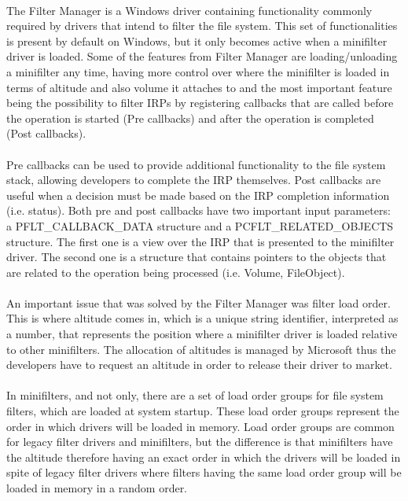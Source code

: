 		\paragraph{}
		The Filter Manager is a Windows driver containing functionality commonly required by drivers that intend to filter the file system. This set of functionalities is present by default on Windows, but it only becomes active when a minifilter driver is loaded\cite{MSDNFltMgrConcepts}. Some of the features from Filter Manager are loading/unloading a minifilter any time, having more control over where the minifilter is loaded in terms of altitude and also volume it attaches to and the most important feature being the possibility to filter IRPs by registering callbacks that are called before the operation is started (Pre callbacks) and after the operation is completed (Post callbacks). 
		
		\paragraph{}	
		Pre callbacks can be used to provide additional functionality to the file system stack, allowing developers to complete the IRP themselves. Post callbacks are useful when a decision must be made based on the IRP completion information (i.e. status). Both pre and post callbacks have two important input parameters: \\ a PFLT\_CALLBACK\_DATA structure and a PCFLT\_RELATED\_OBJECTS structure. The first one is a view over the IRP that is presented to the minifilter driver. The second one is a structure that contains pointers to the objects that are related to the operation being processed (i.e. Volume, FileObject).
		
		\paragraph{}
		An important issue that was solved by the Filter Manager was filter load order. This is where altitude comes in, which is a unique string identifier, interpreted as a number, that represents the position where a minifilter driver is loaded relative to other minifilters. The allocation of altitudes is managed by Microsoft thus the developers have to request an altitude in order to release their driver to market\cite{MSDNFltMgrConcepts}.
		
		\paragraph{}
		In minifilters, and not only, there are a set of load order groups for file system filters, which are loaded at system startup. These load order groups represent the order in which drivers will be loaded in memory\cite{MSDNFltMgrConcepts}. Load order groups are common for legacy filter drivers and minifilters, but the difference is that minifilters have the altitude therefore having an exact order in which the drivers will be loaded in spite of legacy filter drivers where filters having the same load order group will be loaded in memory in a random order.
		
